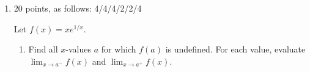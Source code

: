 \documentclass{article}
\begin{document}
\begin{enumerate}
\begin{minipage}{1.0\linewidth}
\begin{multicols}{2}
      \end{multicols}      
    \end{minipage}

  \pspace{\newpage}
  






\item 

\begin{grading}
20 points, as follows: 4/4/4/2/2/4
\end{grading}

Let $f(x) = x e^{1/x}$.  
  \begin{enumerate}

  \item
    \begin{problem}[\vfill]
      Find all $x$-values $a$ for which $f(a)$ is undefined.  
      For each value, evaluate $\displaystyle \lim_{x \to a^-} f(x)$ and
      $\displaystyle \lim_{x \to a^+} f(x)$. 
    \end{problem}


\end{enumerate}
\end{enumerate}
\end{document}
